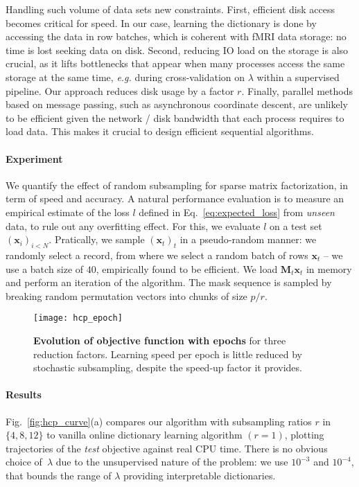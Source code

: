 \documentclass{article}
\def\x{{\mathbf x}}
\def\x{{\mathbf x}}
\def\M{{\mathbf M}}
\begin{document}
Handling such volume of data sets new constraints. First,
efficient disk access becomes critical for speed. In our case,
learning the dictionary is done by accessing the data in row batches, which is
coherent with fMRI data storage: no time is lost seeking data on
disk. Second, reducing IO load on the storage is also
crucial, as it lifts bottlenecks that appear when many processes
access the same storage at the same time, \emph{e.g.} during
cross-validation on $\lambda$ within a supervised pipeline. Our approach
reduces disk usage by a factor $r$. Finally,
parallel methods based on message passing, such as
asynchronous coordinate descent, are unlikely to be efficient given the network /
disk bandwidth that each process requires to load data. This makes it crucial to design
efficient sequential algorithms.


\paragraph{Experiment}We quantify the effect of random subsampling for sparse
matrix factorization, in term of speed and accuracy.
A natural performance evaluation is to measure an
empirical estimate of the loss $l$ defined in Eq.~\ref{eq:expected_loss} from \textit{unseen} data, to
rule out any overfitting effect. For this, we evaluate $l$ on a test set $(\x_i)_{i < N}$.
Pratically, we sample $(\x_t)_t$ in a pseudo-random manner: we randomly select a
record, from where we select a random batch of rows $\x_t$ -- we use a batch
size of $40$, empirically found to be efficient. We load $\M_t \x_t$ in memory
and perform an iteration of the algorithm. The mask sequence is sampled by breaking random permutation vectors into chunks of size $p / r$.

\begin{figure}
\texttt{[image: hcp\_epoch]}
\vspace{-1.5em}
\caption{\textbf{Evolution of objective function with epochs} for three reduction factors. Learning speed per epoch is little reduced
 by stochastic subsampling, despite the speed-up factor it provides.
\label{fig:epoch}}
\end{figure}

\paragraph{Results}Fig.~\ref{fig:hcp_curve}(a) compares our algorithm with
subsampling ratios $r$ in $\{4, 8, 12\}$ to vanilla online dictionary learning
algorithm $(r = 1)$, plotting trajectories of the \emph{test} objective against real CPU
time. There is no obvious choice of~$\lambda$ due to the unsupervised nature of
the problem: we use $10^{-3}$ and $10^{-4}$, that bounds the range of $\lambda$ providing
interpretable dictionaries.
\end{document}
